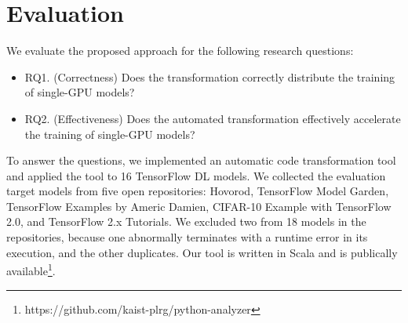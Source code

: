 \section{Evaluation}\label{sec:eval}
We evaluate the proposed approach for the following research questions:
\begin{itemize}
\item RQ1. (Correctness) Does the transformation correctly distribute the
  training of single-GPU models?
\item RQ2. (Effectiveness) Does the automated transformation effectively accelerate the
  training of single-GPU models?
\end{itemize}

\noindent
To answer the questions, we implemented an automatic code transformation tool
and applied the tool to 16 TensorFlow DL models.
We collected the evaluation target models from five open repositories: 
Hovorod\cite{horovodgithub}, TensorFlow Model Garden\cite{tfmodelgarden},
TensorFlow Examples by Americ Damien\cite{tfexamplesdamien},
CIFAR-10 Example with TensorFlow 2.0\cite{cifar10github}, and
TensorFlow 2.x Tutorials\cite{tf2tutogithub}.
We excluded two from 18 models in the repositories, because one abnormally
terminates with a runtime error in its execution, and the other duplicates.
Our tool is written in Scala and is publically
available\footnote{https://github.com/kaist-plrg/python-analyzer}.

